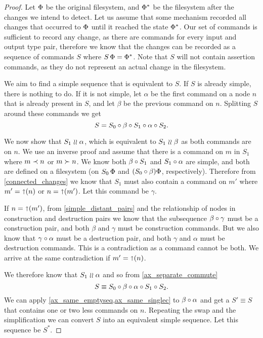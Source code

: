 \begin{proof}
Let $\Phi$ be the original filesystem, and $\Phi^*$
be the filesystem after the changes we intend to detect.
Let us assume that some mechanism recorded all changes that occurred
to $\Phi$ until it reached the state $\Phi^*$.
Our set of commands is sufficient to record any change, as
there are commands for every input and output type pair, therefore
we know that the changes can be recorded as a sequence of commands $S$
where $S\,\Phi=\Phi^*$.
Note that $S$ will not contain assertion commands, as they do not
represent an actual change in the filesystem.

\newcommand{\ucx}{\alpha}
\newcommand{\ucy}{\beta}
\newcommand{\ucz}{\gamma}

We aim to find a simple sequence that is equivalent to $S$.
If $S$ is already simple, there is nothing to do.
If it is not simple, let $\ucx$ be the first command
on a node $n$ that is already present in $S$,
and let $\ucy$ be the previous command on $n$.
Splitting $S$ around these commands we get
\[ S = S_0 \cc \ucy \cc S_1 \cc \ucx \cc S_2. \]

We now show that $S_1\indep\ucx$,
which is equivalent to $S_1\indep\ucy$ as both commands are on $n$.
We use an inverse proof and assume that there is a command on $m$ in $S_1$
where $m\prec n$ or $m\succ n$.
We know both $\ucy\cc S_1$ and $S_1\cc\ucx$ are simple,
and both are defined on a filesystem
(on $S_0\,\Phi$ and $(S_0\mathbin{\circ}\beta)\Phi$, respectively).
Therefore from \cref{connected_changes} we know that
$S_1$ must also contain a command on $m'$ where
$m'=\mathord{\shortuparrow}({n})$ or $n=\mathord{\shortuparrow}({m'})$.
Let this command be $\ucz$.

If $n=\mathord{\shortuparrow}({m'})$,
from \cref{simple_distant_pairs} 
and the relationship of nodes in construction and destruction pairs
we know that the subsequence
$\ucy\cc\ucz$ must be a construction pair,
and both $\ucy$ and $\ucz$ must be construction commands.
But we also know that $\ucz\cc\ucx$ must be a destruction pair,
and both $\ucz$ and $\ucx$ must be destruction commands.
This is a contradiction as a command cannot be both.
We arrive at the same contradiction if $m'=\mathord{\shortuparrow}({n})$.

We therefore know that $S_1\indep\ucx$ and so
from \cref{ax_separate_commute}
\[ S \equiv S_0\cc\ucy\cc\ucx\cc S_1 \cc S_2. \]
We can apply \cref{ax_same_emptyseq,ax_same_singlec} to
$\ucy\cc\ucx$ and get a $S'\equiv S$ that contains one or two less commands on $n$.
Repeating the swap and the simplification we
can convert $S$ into an equivalent simple sequence.
Let this sequence be $S^*$.


\end{proof}
